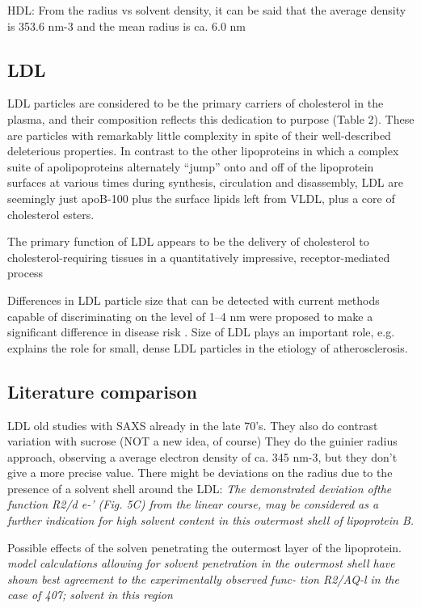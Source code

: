 HDL: From the radius vs solvent density, it can be said that the average density is 353.6 nm-3 and the mean radius is ca. 6.0 nm

\subsection{LDL}
LDL particles are considered to be the primary carriers of cholesterol
in the plasma, and their composition reflects this dedication to purpose (Table 2). These are
particles with remarkably little complexity in spite of their well-described deleterious
properties. In contrast to the other lipoproteins in which a complex suite of apolipoproteins
alternately “jump” onto and off of the lipoprotein surfaces at various times during synthesis,
circulation and disassembly, LDL are seemingly just apoB-100 plus the surface lipids left from
VLDL, plus a core of cholesterol esters.

The primary function of LDL appears to be the delivery of cholesterol to
cholesterol-requiring tissues in a quantitatively impressive, receptor-mediated process

Differences in LDL particle size that can be detected with current methods capable of discriminating on the level of 1–4 nm were proposed to make a significant difference in disease risk \cite{gardner_cd_association_1996}. Size of LDL plays an important role, e.g. explains the role for small, dense LDL particles in the etiology of atherosclerosis.

\subsection{Literature comparison}

\cite{muller_structure_1978} 

LDL old studies with SAXS already in the late 70's. They also do contrast variation with sucrose (NOT a new idea, of course) They do the guinier radius approach, observing a average electron density of ca. 345 nm-3, but they don't give a more precise value. There might be deviations on the radius due to the presence of a solvent shell around the LDL: \emph{The demonstrated deviation ofthe function R2/d e-' (Fig. 5C) from  the linear course, may be considered as a  further  indication  for high solvent content in this outermost shell of lipoprotein B. }

 Possible effects of the solven penetrating the outermost layer of the lipoprotein. \emph{model calculations  allowing  for solvent penetration in the outermost shell have shown best agreement to the  experimentally observed func- tion R2/AQ-l in the case of 407; solvent in this region} 
 
